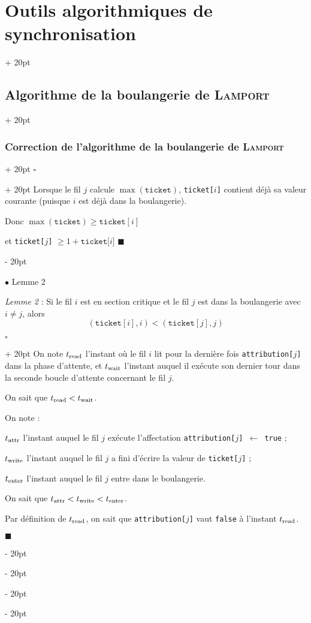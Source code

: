 \documentclass[a4paper, 12pt, twoside]{article}
\renewcommand{\ge}{\geqslant}
\newcommand{\ind}[1][20pt]{\advance\leftskip + #1}
\newcommand{\deind}[1][20pt]{\advance\leftskip - #1}
\newenvironment{indt}[2][20pt]{#2 \par \ind[#1]}{\par \deind} %
\newenvironment{proof}[1][{}]{\begin{indt}{$\square$ #1}}{$\blacksquare$ \end{indt}}
\begin{document}
\begin{indt}{\section{Outils algorithmiques de synchronisation}}
\begin{indt}{\subsection{Algorithme de la boulangerie de \textsc{Lamport}}}
\begin{indt}{\subsubsection{Correction de l'algorithme de la boulangerie de \textsc{Lamport}}}
                \begin{proof}
                    Lorsque le fil $j$ calcule $\max(\mathtt{ticket})$, \texttt{ticket[$i$]} contient déjà sa valeur courante (puisque $i$ est déjà dans la boulangerie).

                    Donc $\max(\mathtt{ticket}) \ge \mathtt{ticket}[i]$

                    et \texttt{ticket[$j$]} $\ge 1 + \mathtt{ticket[} i \mathtt ]$
                \end{proof}

                \vspace{12pt}
                
                $\bullet$ Lemme 2

                \begin{emphBox}
                    \textit{Lemme 2} :
                    Si le fil $i$ est en section critique et le fil $j$ est dans la boulangerie avec $i \neq j$, alors
                    \[
                        (\mathtt{ticket}[i], i) < (\mathtt{ticket}[j], j)
                    \]
                \end{emphBox}

                \begin{proof}
                    On note $t_{\rm read}$ l'instant où le fil $i$ lit pour la dernière fois \texttt{attribution[$j$]} dans la phase d'attente, et $t_{\rm wait}$ l'instant auquel il exécute son dernier tour dans la seconde boucle d'attente concernant le fil $j$.

                    On sait que $t_{\rm read} < t_{\rm wait}$.

                    On note :

                    $t_{\rm attr}$ l'instant auquel le fil $j$ exécute l'affectation \texttt{attribution[$j$] $\leftarrow$ true} ;

                    $t_{\rm write}$ l'instant auquel le fil $j$ a fini d'écrire la valeur de \texttt{ticket[$j$]} ;

                    $t_{\rm enter}$ l'instant auquel le fil $j$ entre dans le boulangerie.

                    \vspace{6pt}
                    
                    On sait que $t_{\rm attr} < t_{\rm write} < t_{\rm enter}$.

                    Par définition de $t_{\rm read}$, on sait que \texttt{attribution[$j$]} vaut \texttt{false} à l'instant $t_{\rm read}$.


\end{proof}
\end{indt}
\end{indt}
\end{indt}
\end{document}
